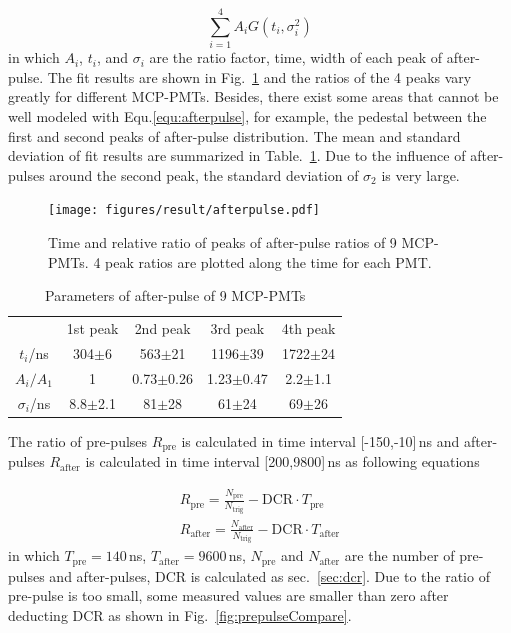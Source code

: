 \begin{equation}
    \label{equ:afterpulse}
    \sum_{i=1}^{4}{A_iG(t_i,\sigma_i^2)}
\end{equation}
in which $A_i$, $t_i$, and $\sigma_i$ are the ratio factor, time, width of each peak of after-pulse. The fit results are shown in Fig.~\ref{fig:afterpulsePeak} and the ratios of the 4 peaks vary greatly for different MCP-PMTs. Besides, there exist some areas that cannot be well modeled with Equ.\eqref{equ:afterpulse}, for example, the pedestal between the first and second peaks of after-pulse distribution. The mean and standard deviation of fit results are summarized in Table.~\ref{tab:afterpulse}. Due to the influence of after-pulses around the second peak, the standard deviation of $\sigma_2$ is very large.
\begin{figure}[!htbp]
    \centering
    \texttt{[image: figures/result/afterpulse.pdf]}
    \caption{Time and relative ratio of peaks of after-pulse ratios of 9 MCP-PMTs. 4 peak ratios are plotted along the time for each PMT.}
    \label{fig:afterpulsePeak}
\end{figure}

\begin{table}
    \centering
    \caption{Parameters of after-pulse of 9 MCP-PMTs}
    \label{tab:afterpulse}
    \begin{tabular}{c|c|c|c|c}
        \hline
        &1st peak&2nd peak&3rd peak&4th peak\\
        $t_i$/ns&304$\pm$6&563$\pm$21&1196$\pm$39&1722$\pm$24\\
        $A_i/A_1$&1&0.73$\pm$0.26&1.23$\pm$0.47&2.2$\pm$1.1\\
        $\sigma_i$/ns&8.8$\pm$2.1&81$\pm$28&61$\pm$24&69$\pm$26\\
        \hline
    \end{tabular}
\end{table}

The ratio of pre-pulses $R_{\mathrm{pre}}$ is calculated in time interval [-150,-10]\,ns and after-pulses $R_{\mathrm{after}}$ is calculated in time interval [200,9800]\,ns as following equations

\begin{align}
    R_{\mathrm{pre}} = \frac{N_{\mathrm{pre}}}{N_\mathrm{trig}} - \mathrm{DCR}\cdot T_{\mathrm{pre}}\\
    R_{\mathrm{after}} = \frac{N_{\mathrm{after}}}{N_\mathrm{trig}} - \mathrm{DCR}\cdot T_{\mathrm{after}}
\end{align}
in which $T_{\mathrm{pre}}=140$\,ns, $T_{\mathrm{after}}=9600$\,ns, $N_{\mathrm{pre}}$ and $N_{\mathrm{after}}$ are the number of pre-pulses and after-pulses, DCR is calculated as sec.~\ref{sec:dcr}. Due to the ratio of pre-pulse is too small, some measured values are smaller than zero after deducting DCR as shown in Fig.~\ref{fig:prepulseCompare}.

